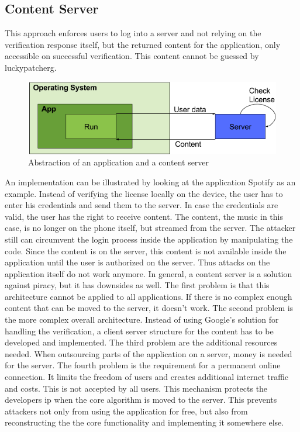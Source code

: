 \subsection{Content Server} \label{section:counter-replace-server}
This approach enforces users to log into a server and not relying on the verification response itself, but the returned content for the application, only accessible on successful verification.
This content cannot be guessed by \gls{luckypatcherg}.
\newline
\begin{figure}[h]
    \centering
    \includegraphics[width=1\textwidth]{data/contentServer.png}
    \caption{Abstraction of an application and a content server}
    \label{fig:contentServer}
\end{figure}
An implementation can be illustrated by looking at the application Spotify \cite{spotify} as an example.
Instead of verifying the license locally on the device, the user has to enter his credentials and send them to the server.
In case the credentials are valid, the user has the right to receive content.
The content, the music in this case, is no longer on the phone itself, but streamed from the server.
The attacker still can circumvent the login process inside the application by manipulating the code.
Since the content is on the server, this content is not available inside the application until the user is authorized on the server.
Thus attacks on the application itself do not work anymore.
\newline
\newline
In general, a content server is a solution against piracy, but it has downsides as well.
The first problem is that this architecture cannot be applied to all applications.
If there is no complex enough content that can be moved to the server, it doesn't work.
\newline
The second problem is the more complex overall architecture.
Instead of using Google's solution for handling the verification, a client server structure for the content has to be developed and implemented.
\newline
The third problem are the additional resources needed.
When outsourcing parts of the application on a server, money is needed for the server.
\newline
The fourth problem is the requirement for a permanent online connection.
It limits the freedom of users and creates additional internet traffic and costs.
This is not accepted by all users.
\newline
\newline
This mechanism protects the developers \gls{ip} when the core algorithm is moved to the server.
This prevents attackers not only from using the application for free, but also from reconstructing the the core functionality and implementing it somewhere else.
